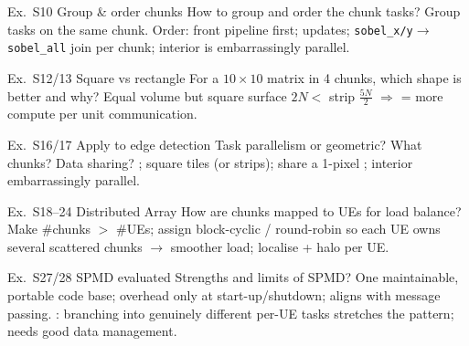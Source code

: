 \begin{example2}{Ex.\ S10 Group \& order chunks}
    How to group and order the chunk tasks?
    \tcblower
    Group tasks on the same chunk. Order: front pipeline first;  updates; \texttt{sobel\_x/y}$\to$\texttt{sobel\_all} join per chunk; interior is embarrassingly parallel.
\end{example2}

\begin{example2}{Ex.\ S12/13 Square vs rectangle}
    For a $10\times10$ matrix in 4 chunks, which shape is better and why?
    \tcblower
    Equal volume but square surface $2N <$ strip $\tfrac{5N}{2}$ $\Rightarrow$  = more compute per unit communication.
\end{example2}

\begin{example2}{Ex.\ S16/17 Apply to edge detection}
    Task parallelism or geometric? What chunks? Data sharing?
    \tcblower
    ; square tiles (or strips); share a 1-pixel ; interior embarrassingly parallel.
\end{example2}

\begin{example2}{Ex.\ S18--24 Distributed Array}
    How are chunks mapped to UEs for load balance?
    \tcblower
    Make \#chunks $>$ \#UEs; assign block-cyclic / round-robin so each UE owns several scattered chunks $\to$ smoother load; localise + halo per UE.
\end{example2}

\begin{example2}{Ex.\ S27/28 SPMD evaluated}
    Strengths and limits of SPMD?
    \tcblower
    One maintainable, portable code base; overhead only at start-up/shutdown; aligns with message passing. : branching into genuinely different per-UE tasks stretches the pattern; needs good data management.
\end{example2}
